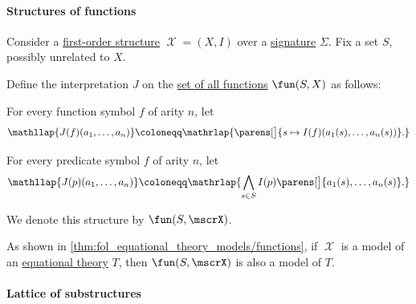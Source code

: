\paragraph{Structures of functions}

\begin{definition}\label{def:fol_structure_of_functions}\mimprovised
  Consider a \hyperref[def:fol_structure]{first-order structure} \( \mscrX = (X, I) \) over a \hyperref[def:fol_signature]{signature} \( \Sigma \). Fix a set \( S \), possibly unrelated to \( X \).

  Define the interpretation \( J \) on the \hyperref[def:set_of_all_functions]{set of all functions} \( \fun(S, X) \) as follows:
  \begin{thmenum}
     For every function symbol \( f \) of arity \( n \), let
    \begin{equation*}
      \mathllap{J(f)(a_1, \ldots, a_n)} \coloneqq \mathrlap{\parens[\big]{ s \mapsto I(f)(a_1(s), \ldots, a_n(s)) }.}
    \end{equation*}

     For every predicate symbol \( f \) of arity \( n \), let
    \begin{equation*}
      \mathllap{J(p)(a_1, \ldots, a_n)} \coloneqq \mathrlap{\bigwedge_{s \in S} I(p)\parens[\big]{ a_1(s), \ldots, a_n(s) }.}
    \end{equation*}
  \end{thmenum}

  We denote this structure by \( \fun(S, \mscrX) \).
\end{definition}
\begin{comments}
  \item As shown in \cref{thm:fol_equational_theory_models/functions}, if \( \mscrX \) is a model of an \hyperref[def:fol_equational_theory]{equational theory} \( T \), then \( \fun(S, \mscrX) \) is also a model of \( T \).
\end{comments}

\paragraph{Lattice of substructures}

